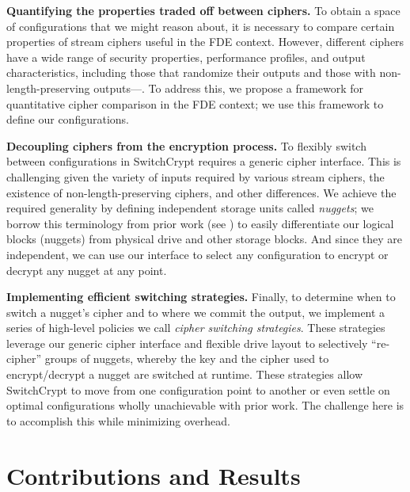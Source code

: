\textbf{Quantifying the properties traded off between ciphers.} To
obtain a space of configurations that we might reason about, it is
necessary to compare certain properties of stream ciphers useful in
the FDE context. However, different ciphers have a wide range of
security properties, performance profiles, and output characteristics,
including those that randomize their outputs and those with
non-length-preserving outputs---. To address this, we propose a framework for
quantitative cipher comparison in the FDE context; we use this
framework to define our configurations.

\textbf{Decoupling ciphers from the encryption process.} To flexibly switch
between configurations in SwitchCrypt requires a generic cipher interface. This
is challenging given the variety of inputs required by various stream ciphers,
the existence of non-length-preserving ciphers, and other differences. We
achieve the required generality by defining independent storage units called
\emph{nuggets}; we borrow this terminology from prior work (see
\cite{StrongBox}) to easily differentiate our logical blocks (nuggets) from
physical drive and other storage blocks. And since they are independent, we can
use our interface to select any configuration to encrypt or decrypt any nugget
at any point.

\textbf{Implementing efficient switching strategies.} Finally, to determine when
to switch a nugget's cipher and to where we commit the output, we implement a
series of high-level policies we call \textit{cipher switching strategies}.
These strategies leverage our generic cipher interface and flexible drive layout
to selectively ``re-cipher'' groups of nuggets, whereby the key and the cipher
used to encrypt/decrypt a nugget are switched at runtime. These strategies allow
SwitchCrypt to move from one configuration point to another or even settle on
optimal configurations wholly unachievable with prior work. The challenge here
is to accomplish this while minimizing overhead.

\section{Contributions and Results}
\label{sec:key-contributions}


